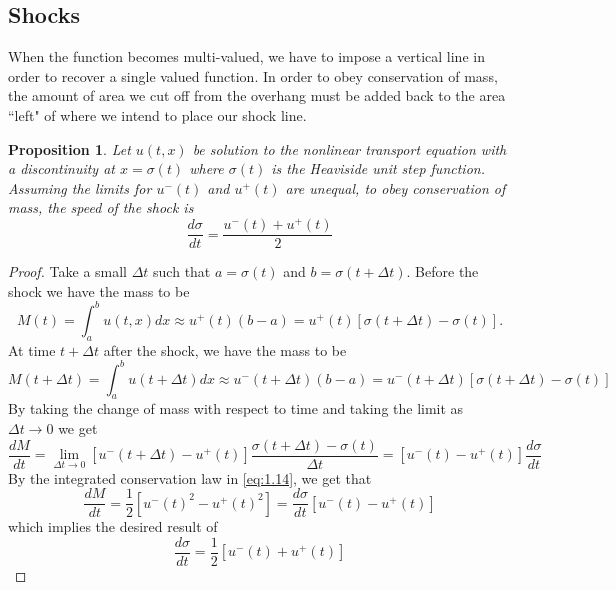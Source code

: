 \documentclass{article}
\newcommand{\od}[2]{\frac{d #1}{d #2}}
\newtheorem{proposition}[theorem]{Proposition}
\numberwithin{equation}{section}
\begin{document}
\subsection{Shocks}
When the function becomes multi-valued, we have to impose a vertical line in order to recover a single valued function. In order to obey conservation of mass, the amount of area we cut off from the overhang must be added back to the area ``left" of where we intend to place our shock line. 
\begin{proposition}
    Let $u(t,x)$ be solution to the nonlinear transport equation with a discontinuity at $x=\sigma(t)$ where $\sigma(t)$ is the Heaviside unit step function. Assuming the limits for $u^-(t)$ and $u^+(t)$ are unequal, to obey conservation of mass, the speed of the shock is 
    \begin{equation*}
        \od{\sigma}{t} = \frac{u^-(t)+u^+(t)}{2}
    \end{equation*}
\end{proposition}
\begin{proof}
    Take a small $\Delta t$ such that $a=\sigma(t)$ and $b=\sigma(t+\Delta t)$. Before the shock we have the mass to be 
    \begin{equation*}
        M(t) = \int^b_au(t,x)dx \approx u^+(t)(b-a) = u^+(t)[\sigma(t+\Delta t)-\sigma(t)].
    \end{equation*}
    At time $t+\Delta t$ after the shock, we have the mass to be 
    \begin{equation*}
        M(t+\Delta t) = \int^b_au(t+\Delta t)dx \approx u^-(t+\Delta t)(b-a)=u^-(t+\Delta t)[\sigma(t+\Delta t)-\sigma(t)]
    \end{equation*}
    By taking the change of mass with respect to time and taking the limit as $\Delta t \rightarrow 0$ we get 
    \begin{equation*}
        \od{M}{t} = \lim_{\Delta t \rightarrow 0}[u^-(t+\Delta t)-u^+(t)]\frac{\sigma(t+\Delta t)-\sigma(t)}{\Delta t} = [u^-(t)-u^+(t)]\od{\sigma}{t}
    \end{equation*}
    By the integrated conservation law in \eqref{eq:1.14}, we get that 
    \begin{equation*}
        \od{M}{t} = \frac{1}{2}[u^-(t)^2-u^+(t)^2] = \od{\sigma}{t}[u^-(t)-u^+(t)]
    \end{equation*}
    which implies the desired result of
    \begin{equation*}
        \od{\sigma}{t} = \frac{1}{2}[u^-(t)+u^+(t)]
    \end{equation*}
\end{proof}
\end{document}
